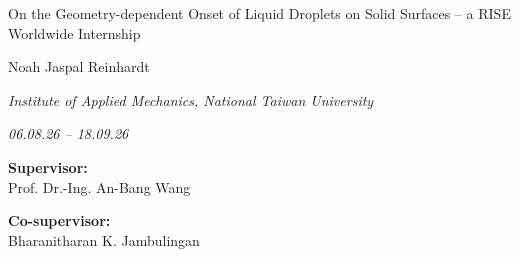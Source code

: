 
\begin{center}

    {\LARGE On the Geometry-dependent Onset of Liquid Droplets on Solid Surfaces -- a RISE Worldwide Internship\par}
    \vspace{0.5cm}
    {\large{Noah Jaspal Reinhardt}\par}
    \vspace{0.5cm}

    {\large{\textit{Institute of Applied Mechanics, National Taiwan University}}\par}
    {\large{\textit{06.08.26 -- 18.09.26}}\par}
    
\end{center}
 
    \vspace{0.5cm}

    \begin{minipage}[t]{0.5\textwidth}
        \raggedright
        {\large\bfseries Supervisor:}\\
        \vspace{0.1cm}
        {\large Prof. Dr.-Ing. An-Bang Wang}
    \end{minipage}%
    \begin{minipage}[t]{0.5\textwidth}
        \raggedleft
        {\large\bfseries Co-supervisor:}\\
        \vspace{0.1cm}
        {\large Bharanitharan K. Jambulingan}
    \end{minipage}
    \vspace{1cm}




